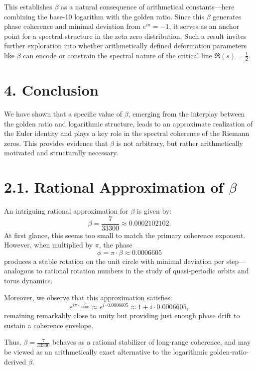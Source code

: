\documentclass[12pt]{article}
\begin{document}
This establishes \(\beta\) as a natural consequence of arithmetical constants—here combining the base-10 logarithm with the golden ratio. Since this \(\beta\) generates phase coherence and minimal deviation from \(e^{i\pi} = -1\), it serves as an anchor point for a spectral structure in the zeta zero distribution. Such a result invites further exploration into whether arithmetically defined deformation parameters like \(\beta\) can encode or constrain the spectral nature of the critical line \(\Re(s) = \tfrac{1}{2}\).

\section*{4. Conclusion}

We have shown that a specific value of \(\beta\), emerging from the interplay between the golden ratio and logarithmic structure, leads to an approximate realization of the Euler identity and plays a key role in the spectral coherence of the Riemann zeros. This provides evidence that \(\beta\) is not arbitrary, but rather arithmetically motivated and structurally necessary.

\section*{2.1. Rational Approximation of \(\beta\)}

An intriguing rational approximation for \(\beta\) is given by:
\[
\beta = \frac{7}{33300} \approx 0.0002102102.
\]
At first glance, this seems too small to match the primary coherence exponent. However, when multiplied by \(\pi\), the phase
\[
\phi = \pi \cdot \beta \approx 0.0006605
\]
produces a stable rotation on the unit circle with minimal deviation per step—analogous to rational rotation numbers in the study of quasi-periodic orbits and torus dynamics.

Moreover, we observe that this approximation satisfies:
\[
e^{i \pi \cdot \frac{7}{33300}} \approx e^{i \cdot 0.0006605} \approx 1 + i \cdot 0.0006605,
\]
remaining remarkably close to unity but providing just enough phase drift to sustain a coherence envelope.

Thus, \(\beta = \frac{7}{33300}\) behaves as a rational stabilizer of long-range coherence, and may be viewed as an arithmetically exact alternative to the logarithmic golden-ratio-derived \(\beta\).
\end{document}
